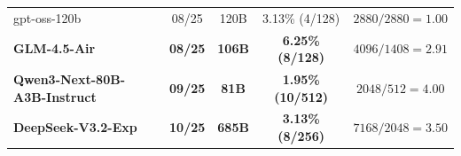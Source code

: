 \begin{table}[!ht]
\begin{tabular}{lcccc}
gpt-oss-120b \citep{openai2025gptoss120bgptoss20bmodel} & 08/25 & 120B & 3.13\% (4/128) & $2880 / 2880 = 1.00$ \\

\textbf{GLM-4.5-Air} \citep{zeng2025glm}& \textbf{08/25} & \textbf{106B} & \textbf{6.25\% (8/128)} & \textbf{$4096 / 1408 = 2.91$} \\

\textbf{Qwen3-Next-80B-A3B-Instruct} \citep{qwen3technicalreport} & \textbf{09/25} & \textbf{81B} & \textbf{1.95\% (10/512)} & \textbf{$2048/512=4.00$} \\

\textbf{DeepSeek-V3.2-Exp} \citep{deepseekai2024deepseekv32} & \textbf{10/25} & \textbf{685B} & \textbf{3.13\% (8/256)} & \textbf{$7168/2048=3.50$} \\

\bottomrule
\end{tabular}
\end{table}
\raggedbottom